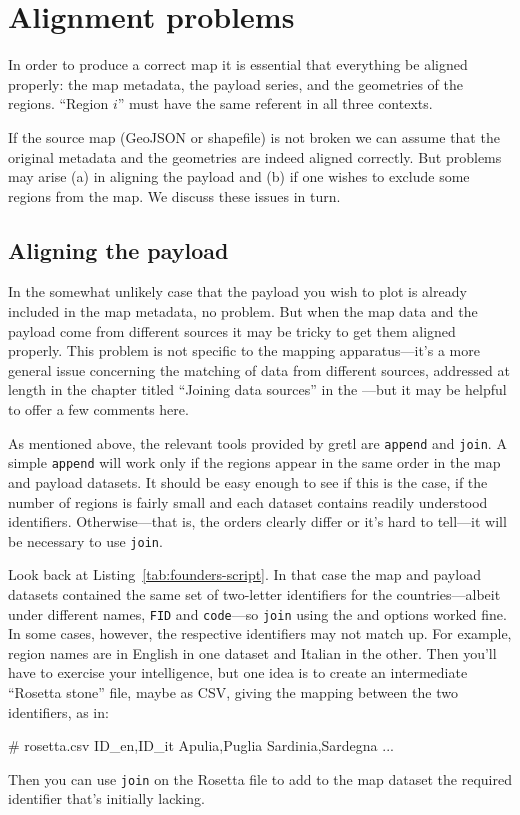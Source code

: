 \documentclass{article}
\begin{document}
\section{Alignment problems}
\label{sec:pairing}

In order to produce a correct map it is essential that everything be
aligned properly: the map metadata, the payload series, and the
geometries of the regions. ``Region $i$'' must have the same referent
in all three contexts.

If the source map (GeoJSON or shapefile) is not broken we can assume
that the original metadata and the geometries are indeed aligned
correctly. But problems may arise (a) in aligning the payload and (b)
if one wishes to exclude some regions from the map. We discuss these
issues in turn.

\subsection{Aligning the payload}

In the somewhat unlikely case that the payload you wish to plot is
already included in the map metadata, no problem. But when the map
data and the payload come from different sources it may be tricky to
get them aligned properly. This problem is not specific to the mapping
apparatus---it's a more general issue concerning the matching of data
from different sources, addressed at length in the chapter titled
``Joining data sources'' in the \GUG{}---but it may be helpful to
offer a few comments here.

As mentioned above, the relevant tools provided by gretl are
\texttt{append} and \texttt{join}. A simple \texttt{append} will work
only if the regions appear in the same order in the map and payload
datasets. It should be easy enough to see if this is the case, if the
number of regions is fairly small and each dataset contains readily
understood identifiers. Otherwise---that is, the orders clearly differ
or it's hard to tell---it will be necessary to use \texttt{join}.

Look back at Listing~\ref{tab:founders-script}. In that case the map
and payload datasets contained the same set of two-letter identifiers
for the countries---albeit under different names, \texttt{FID} and
\texttt{code}---so \texttt{join} using the  and
 options worked fine. In some cases, however, the
respective identifiers may not match up. For example, region names are
in English in one dataset and Italian in the other. Then you'll have
to exercise your intelligence, but one idea is to create an
intermediate ``Rosetta stone'' file, maybe as CSV, giving the mapping
between the two identifiers, as in:
\begin{code}
# rosetta.csv
ID_en,ID_it
Apulia,Puglia
Sardinia,Sardegna
...
\end{code}
Then you can use \texttt{join} on the Rosetta file to add to the map
dataset the required identifier that's initially lacking.
\end{document}
